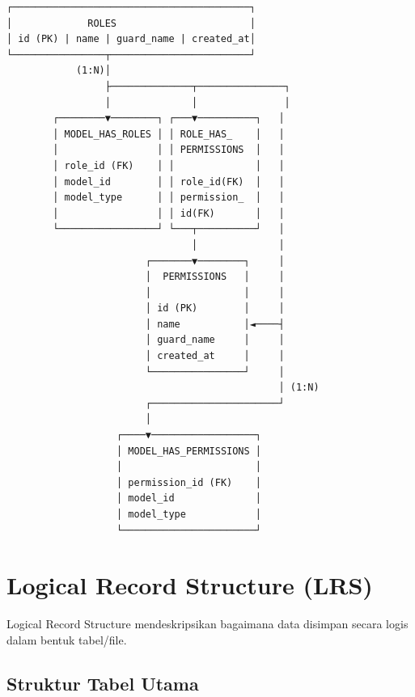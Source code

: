 \documentclass[12pt,a4paper]{article}
\begin{document}
\begin{verbatim}
┌─────────────────────────────────────────┐
│             ROLES                       │
│ id (PK) | name | guard_name | created_at│
└────────────────┬────────────────────────┘
            (1:N)│
                 ├──────────────┬───────────────┐
                 │              │               │
        ┌────────▼────────┐ ┌───▼──────────┐   │
        │ MODEL_HAS_ROLES │ │ ROLE_HAS_    │   │
        │                 │ │ PERMISSIONS  │   │
        │ role_id (FK)    │ │              │   │
        │ model_id        │ │ role_id(FK)  │   │
        │ model_type      │ │ permission_  │   │
        │                 │ │ id(FK)       │   │
        └─────────────────┘ └───┬──────────┘   │
                                │              │
                        ┌───────▼────────┐     │
                        │  PERMISSIONS   │     │
                        │                │     │
                        │ id (PK)        │     │
                        │ name           │◄────┤
                        │ guard_name     │     │
                        │ created_at     │     │
                        └────────────────┘     │
                                               │ (1:N)
                        ┌──────────────────────┘
                        │
                   ┌────▼──────────────────┐
                   │ MODEL_HAS_PERMISSIONS │
                   │                       │
                   │ permission_id (FK)    │
                   │ model_id              │
                   │ model_type            │
                   └───────────────────────┘
\end{verbatim}

\newpage

\section{Logical Record Structure (LRS)}

Logical Record Structure mendeskripsikan bagaimana data disimpan secara logis dalam bentuk tabel/file.

\subsection{Struktur Tabel Utama}
\end{document}

